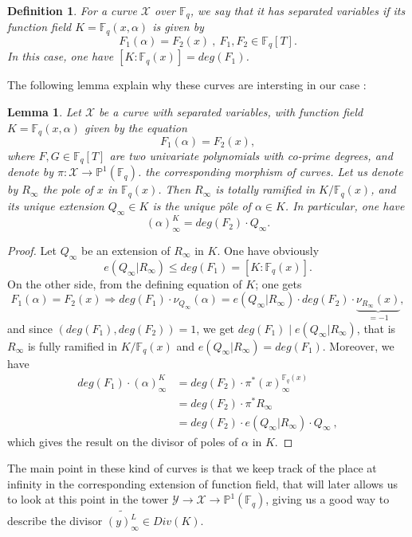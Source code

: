 \documentclass[10pt]{article}
\newtheorem{def1}{Definition}[]
\newtheorem{lem1}{Lemma}[]
\newcommand{\s}{\vspace{0.3cm}}
\newcommand{\cd}{\cdot}
\newcommand{\fq}{\mathbb{F}_q}
\newcommand{\X}{\mathcal{X}}
\newcommand{\Y}{\mathcal{Y}}
\begin{document}
\s

\begin{def1}
For a curve $\X$ over $\fq$, we say that it has separated variables if its function field $K=\fq(x,\alpha)$ is given by
\[F_1(\alpha) = F_2(x) \ , \ F_1,F_2 \in \fq[T].\]
In this case, one have $[K:\fq(x)] = deg(F_1)$.
\end{def1}

\s

The following lemma explain why these curves are intersting in our case :

\s

\begin{lem1}
Let $\X$ be a curve with separated variables, with function field $K=\fq(x,\alpha)$ given by the equation
\[F_1(\alpha) = F_2(x),\]
where $F,G \in \fq[T]$ are two univariate polynomials with co-prime degrees, and denote by $\pi : \X \rightarrow \mathbb{P}^1(\fq)$. the corresponding morphism of curves. Let us denote by $R_{\infty}$ the pole of $x$ in $\fq(x)$. Then $R_{\infty}$ is totally ramified in $K/\fq(x)$, and its unique extension $Q_{\infty} \in K$ is the unique pôle of $\alpha \in K$. In particular, one have 
\[(\alpha)^K_{\infty} = deg(F_2) \cd Q_{\infty}.\]
\end{lem1}

\s

\begin{proof}
Let $Q_{\infty}$ be an extension of $R_{\infty}$ in $K$. One have obviously
\[e(Q_{\infty}|R_{\infty}) \leq deg(F_1)=[K:\fq(x)].\]
On the other side, from the defining equation of $K$; one gets
\[F_1(\alpha) = F_2(x) \Rightarrow deg(F_1) \cd \nu_{Q_{\infty}}(\alpha) = e(Q_{\infty}|R_{\infty}) \cd deg(F_2) \cd \underbrace{\nu_{R_{\infty}}(x)}_{=-1},\]
and since $(deg(F_1),deg(F_2))=1$, we get $deg(F_1) \mid e(Q_{\infty}|R_{\infty})$, that is $R_{\infty}$ is fully ramified in $K/\fq(x)$ and $e(Q_{\infty}|R_{\infty})=deg(F_1)$. Moreover, we have 
\begin{align*}
deg(F_1) \cd (\alpha)^K_{\infty} &= deg(F_2) \cd \pi^*(x)^{\fq(x)}_{\infty} \\
&= deg(F_2) \cd \pi^* R_{\infty} \\
&= deg(F_2) \cd e(Q_{\infty}|R_{\infty}) \cd Q_{\infty} \ ,
\end{align*}
which gives the result on the divisor of poles of $\alpha$ in $K$.
\end{proof}

\s

The main point in these kind of curves is that we keep track of the place at infinity in the corresponding extension of function field, that will later allows us to look at this point in the tower $\Y \rightarrow \X \rightarrow \mathbb{P}^1(\fq)$, giving us a good way to describe the divisor $\widetilde{(y)_{\infty}^L} \in Div(K)$.
\end{document}
